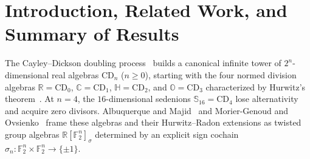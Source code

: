 \documentclass[11pt,reqno]{amsart}
\theoremstyle{plain}
\theoremstyle{definition}
\theoremstyle{remark}
\newcommand{\CD}{\mathrm{CD}}
\newcommand{\R}{\mathbb{R}}
\newcommand{\C}{\mathbb{C}}
\newcommand{\HH}{\mathbb{H}}
\newcommand{\OO}{\mathbb{O}}
\newcommand{\SSed}{\mathbb{S}_{16}}
\newcommand{\F}{\mathbb{F}}
\begin{document}
\tableofcontents

\section{Introduction, Related Work, and Summary of Results}
\label{sec:intro}

The Cayley--Dickson doubling process~\cite{dickson1919,schafer1954,baez2002} builds a
canonical infinite tower of $2^n$-dimensional real algebras $\CD_n$ ($n \ge 0$), starting
with the four normed division algebras $\R = \CD_0$, $\C = \CD_1$, $\HH = \CD_2$, and
$\OO = \CD_3$ characterized by Hurwitz's theorem~\cite{hurwitz1898}. At $n = 4$, the
$16$-dimensional sedenions $\SSed = \CD_4$ lose alternativity and acquire zero divisors.
Albuquerque and Majid~\cite{albuquerque1999} and Morier-Genoud and
Ovsienko~\cite{moriergenoud2011} frame these algebras and their Hurwitz--Radon extensions
as twisted group algebras $\R[\F_2^n]_\sigma$ determined by an explicit sign cochain
$\sigma_n : \F_2^n \times \F_2^n \to \{\pm 1\}$.
\end{document}
